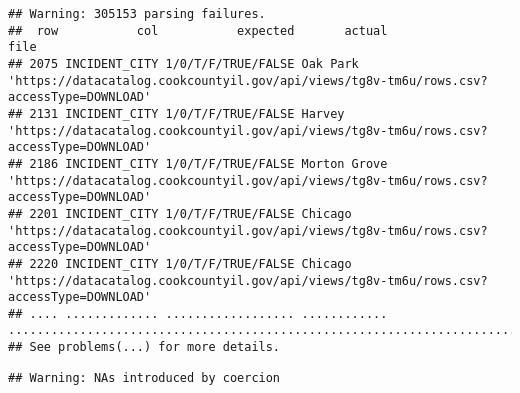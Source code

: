 \documentclass[
]{article}
\newenvironment{Shaded}{\begin{snugshade}}{\end{snugshade}}
\newcommand{\DataTypeTok}[1]{\textcolor[rgb]{0.13,0.29,0.53}{#1}}
\newcommand{\DecValTok}[1]{\textcolor[rgb]{0.00,0.00,0.81}{#1}}
\newcommand{\KeywordTok}[1]{\textcolor[rgb]{0.13,0.29,0.53}{\textbf{#1}}}
\newcommand{\NormalTok}[1]{#1}
\newcommand{\OperatorTok}[1]{\textcolor[rgb]{0.81,0.36,0.00}{\textbf{#1}}}
\newcommand{\OtherTok}[1]{\textcolor[rgb]{0.56,0.35,0.01}{#1}}
\newcommand{\StringTok}[1]{\textcolor[rgb]{0.31,0.60,0.02}{#1}}
\begin{document}
\begin{verbatim}
## Warning: 305153 parsing failures.
##  row           col           expected       actual                                                                                    file
## 2075 INCIDENT_CITY 1/0/T/F/TRUE/FALSE Oak Park     'https://datacatalog.cookcountyil.gov/api/views/tg8v-tm6u/rows.csv?accessType=DOWNLOAD'
## 2131 INCIDENT_CITY 1/0/T/F/TRUE/FALSE Harvey       'https://datacatalog.cookcountyil.gov/api/views/tg8v-tm6u/rows.csv?accessType=DOWNLOAD'
## 2186 INCIDENT_CITY 1/0/T/F/TRUE/FALSE Morton Grove 'https://datacatalog.cookcountyil.gov/api/views/tg8v-tm6u/rows.csv?accessType=DOWNLOAD'
## 2201 INCIDENT_CITY 1/0/T/F/TRUE/FALSE Chicago      'https://datacatalog.cookcountyil.gov/api/views/tg8v-tm6u/rows.csv?accessType=DOWNLOAD'
## 2220 INCIDENT_CITY 1/0/T/F/TRUE/FALSE Chicago      'https://datacatalog.cookcountyil.gov/api/views/tg8v-tm6u/rows.csv?accessType=DOWNLOAD'
## .... ............. .................. ............ .......................................................................................
## See problems(...) for more details.
\end{verbatim}

\begin{Shaded}
\end{Shaded}

\begin{verbatim}
## Warning: NAs introduced by coercion
\end{verbatim}

\begin{Shaded}
\end{Shaded}
\end{document}
